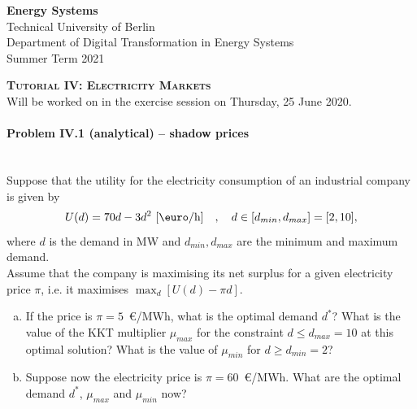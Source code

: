 \documentclass[11pt,a4paper,fleqn]{scrartcl}
\begin{document}
\begin{flushright}
	\textbf{Energy Systems}\\
	{\small Technical University of Berlin}\\
	{\small Department of Digital Transformation in Energy Systems}\\
	{\small Summer Term 2021}\\
\end{flushright}

 
 \vspace{-0.5em}
 \hrulefill
 \vspace{0.3em}

\begin{center}
 \textbf{\textsc{\Large Tutorial IV: Electricity Markets}}\\
 \small Will be worked on in the exercise session on Thursday, 25 June 2020.\\[1.5em]
\end{center}

\vspace{-0.5em}
\hrulefill
\vspace{0.8em}

\paragraph{Problem IV.1 (analytical) -- shadow prices \faGroup}~\\

Suppose that the utility for the electricity consumption of an industrial company is given by
\[
 U(d) = 70d - 3d^2 ~[\textrm{\euro}/\si{\hour}] \quad , \quad d\in [d_{min},d_{max}]=[2,10],
\]
where $d$ is the demand in MW and $d_{min}, d_{max}$ are the minimum and maximum demand. \\
[1em]
Assume that the company is maximising its net surplus for a given electricity price $\pi$, i.e. it maximises $\max_{d} \left[U(d) -
  \pi d\right]$.
\begin{enumerate}[(a)]
 \item  If the price is $\pi = 5$~\euro/MWh, what is the optimal
       demand $d^*$?  What is the value of the KKT multiplier $\mu_{max}$
       for the constraint $d \leq d_{max}=10$ at this optimal solution?
       What is the value of $\mu_{min}$ for $d \geq d_{min} = 2$?
 \item Suppose now the electricity price is $\pi = 60$~\euro/MWh. What are
       the optimal demand $d^*$, $\mu_{max}$ and $\mu_{min}$ now?
\end{enumerate}
\end{document}
